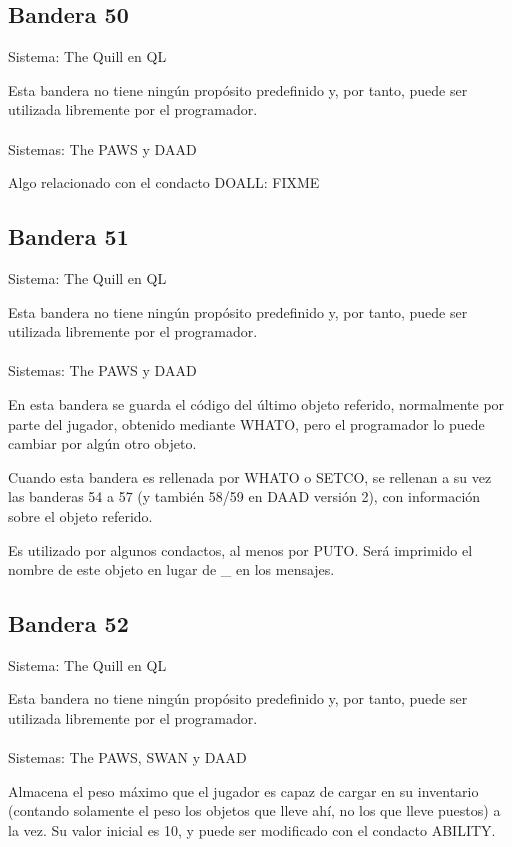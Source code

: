 \documentclass[11pt, a5paper]{article}
\newcommand{\quill}{\textsf{The Quill}\xspace}
\newcommand{\paw}{\textsf{The PAWS}\xspace}
\newcommand{\swan}{\textsf{SWAN}\xspace}
\newcommand{\daad}{\textsf{DAAD}\xspace}
\newcommand{\sistema}[1]{\noindent Sistema: #1 \nopagebreak}
\newcommand{\sistemas}[1]{\noindent Sistemas: #1 \nopagebreak}
\begin{document}
\subsection{Bandera 50}

\sistema{\quill en QL}

Esta bandera no tiene ningún propósito predefinido y, por tanto, puede ser utilizada libremente por el programador.
\\\ \\
\sistemas{\paw y \daad}

Algo relacionado con el condacto DOALL: FIXME

\subsection{Bandera 51}

\sistema{\quill en QL}

Esta bandera no tiene ningún propósito predefinido y, por tanto, puede ser utilizada libremente por el programador.
\\\ \\
\sistemas{\paw y \daad}

En esta bandera se guarda el código del último objeto referido, normalmente por parte del jugador, obtenido mediante WHATO, pero el programador lo puede cambiar por algún otro objeto.

Cuando esta bandera es rellenada por WHATO o SETCO, se rellenan a su vez las banderas 54 a 57 (y también 58/59 en \daad versión 2), con información sobre el objeto referido.

Es utilizado por algunos condactos, al menos por PUTO. Será imprimido el nombre de este objeto en lugar de \_ en los mensajes.

\subsection{Bandera 52}

\sistema{\quill en QL}

Esta bandera no tiene ningún propósito predefinido y, por tanto, puede ser utilizada libremente por el programador.
\\\ \\
\sistemas{\paw, \swan y \daad}

Almacena el peso máximo que el jugador es capaz de cargar en su inventario (contando solamente el peso los objetos que lleve ahí, no los que lleve puestos) a la vez. Su valor inicial es 10, y puede ser modificado con el condacto ABILITY.
\end{document}
